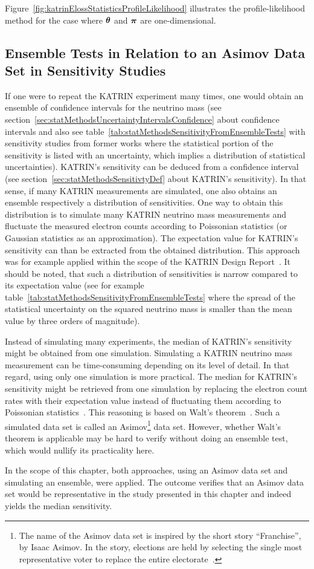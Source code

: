 Figure~\ref{fig:katrinElossStatisticsProfileLikelihood} illustrates the profile-likelihood method for the case where $\boldsymbol{\mathbf{\theta}}$ and $\boldsymbol{\mathbf{\pi}}$ are one-dimensional.

\subsection{Ensemble Tests in Relation to an Asimov Data Set in Sensitivity Studies}
\label{sec:katrinElossStatisticsAsimov}
If one were to repeat the KATRIN experiment many times, one would obtain an ensemble of confidence intervals for the neutrino mass (see section~\ref{sec:statMethodsUncertaintyIntervalsConfidence} about confidence intervals and also see table~\ref{tab:statMethodsSensitivityFromEnsembleTests} with sensitivity studies from former works where the statistical portion of the sensitivity is listed with an uncertainty, which implies a distribution of statistical uncertainties). KATRIN's sensitivity can be deduced from a confidence interval (see section~\ref{sec:statMethodsSensitivtyDef} about KATRIN's sensitivity). In that sense, if many KATRIN measurements are simulated, one also obtains an ensemble respectively a distribution of sensitivities. One way to obtain this distribution is to simulate many KATRIN neutrino mass measurements and fluctuate the measured electron counts according to Poissonian statistics (or Gaussian statistics as an approximation). The expectation value for KATRIN's sensitivity can than be extracted from the obtained distribution. This approach was for example applied within the scope of the KATRIN Design Report~\cite{Angrik:2005ep}. It should be noted, that such a distribution of sensitivities is narrow compared to its expectation value (see for example table~\ref{tab:statMethodsSensitivityFromEnsembleTests} where the spread of the statistical uncertainty on the squared neutrino mass is smaller than the mean value by three orders of magnitude).

Instead of simulating many experiments, the median of KATRIN's sensitivity might be obtained from one simulation. Simulating a KATRIN neutrino mass measurement can be time-consuming depending on its level of detail. In that regard, using only one simulation is more practical. The median for KATRIN's sensitivity might be retrieved from one simulation by replacing the electron count rates with their expectation value instead of fluctuating them according to Poissonian statistics~\cite{Cowan2011}. This reasoning is based on Walt's theorem~\cite{Wald1944}. Such a simulated data set is called an Asimov\footnote{The name of the Asimov data set is inspired by the short story ``Franchise'', by Isaac Asimov. In the story, elections are held by selecting the single most representative voter to replace the entire electorate~\cite{Cowan2011}.} data set. However, whether Walt's theorem is applicable may be hard to verify without doing an ensemble test, which would nullify its practicality here.

In the scope of this chapter, both approaches, using an Asimov data set and simulating an ensemble, were applied. The outcome verifies that an Asimov data set would be representative in the study presented in this chapter and indeed yields the median sensitivity.